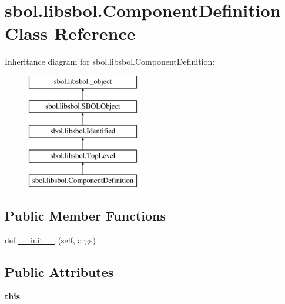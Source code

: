 \hypertarget{classsbol_1_1libsbol_1_1_component_definition}{}\section{sbol.\+libsbol.\+Component\+Definition Class Reference}
\label{classsbol_1_1libsbol_1_1_component_definition}
Inheritance diagram for sbol.\+libsbol.\+Component\+Definition\+:\begin{figure}[H]
\begin{center}
\leavevmode
\includegraphics[height=5.000000cm]{classsbol_1_1libsbol_1_1_component_definition}
\end{center}
\end{figure}
\subsection*{Public Member Functions}
\begin{DoxyCompactItemize}
\item 
def \hyperlink{classsbol_1_1libsbol_1_1_component_definition_a0d3c4265de58eb7964a5c0e4c28c61db}{\+\_\+\+\_\+init\+\_\+\+\_\+} (self, args)
\end{DoxyCompactItemize}
\subsection*{Public Attributes}
\begin{DoxyCompactItemize}
\item 
{\bfseries this}\hypertarget{classsbol_1_1libsbol_1_1_component_definition_a24baf76728c9879a059f7ea40499d3cb}{}\label{classsbol_1_1libsbol_1_1_component_definition_a24baf76728c9879a059f7ea40499d3cb}

\end{DoxyCompactItemize}
